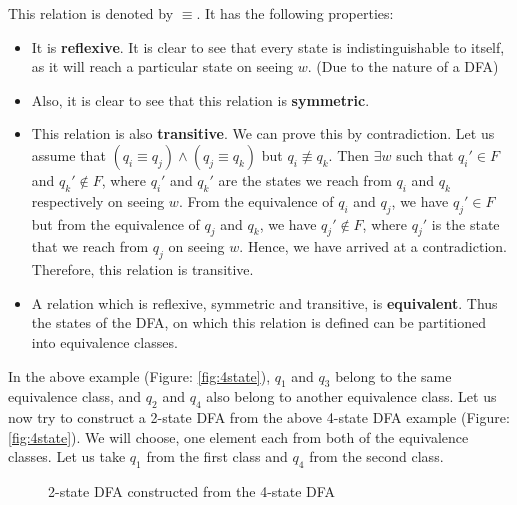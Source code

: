 \documentclass[english, 11pt]{article}
\begin{document}
This relation is denoted by $\equiv$. It has the following properties:
\begin{itemize}
    \item It is \textbf{reflexive}. It is clear to see that every state is indistinguishable to itself, as it will reach a particular state on seeing $w$. (Due to the nature of a DFA)
    \item Also, it is clear to see that this relation is \textbf{symmetric}.
    \item This relation is also \textbf{transitive}. We can prove this by contradiction. Let us assume that $(q_i \equiv q_j) \wedge (q_j \equiv q_k)$ but $q_i \not\equiv q_k$. Then $\exists w$ such that $q_i' \in F$ and $q_k' \notin F$, where $q_i'$ and $q_k'$ are the states we reach from $q_i$ and $q_k$ respectively on seeing $w$. From the equivalence of $q_i$ and $q_j$, we have $q_j' \in F$ but from the equivalence of $q_j$ and $q_k$, we have $q_j' \notin F$, where $q_j'$ is the state that we reach from $q_j$ on seeing $w$. Hence, we have arrived at a contradiction. Therefore, this relation is transitive. 
    \item A relation which is reflexive, symmetric and transitive, is \textbf{equivalent}. Thus the states of the DFA, on which this relation is defined can be partitioned into equivalence classes. 
\end{itemize}


In the above example (Figure: \ref{fig:4state}), $q_1$ and $q_3$ belong to the same equivalence class, and $q_2$ and $q_4$ also belong to another equivalence class. Let us now try to construct a 2-state DFA from the above 4-state DFA example (Figure: \ref{fig:4state}). We will choose, one element each from both of the equivalence classes. Let us take $q_1$ from the first class and $q_4$ from the second class. 

\begin{figure}[htbp]
\begin{center}
\end{center}
\caption{2-state DFA constructed from the 4-state DFA}
\label{fig:2sta}
\end{figure}
\end{document}
